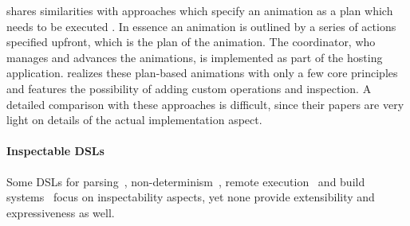 \dsl{} shares similarities with approaches which specify an animation as a plan
which needs to be executed
\cite{DBLP:conf/chi/KurlanderL95,DBLP:conf/eics/MirlacherPB12}. In essence an
animation is outlined by a series of actions specified upfront, which is the
plan of the animation. The coordinator, who manages and advances the
animations, is implemented as part of the hosting application. \dsl{} realizes
these plan-based animations with only a few core principles and features the
possibility of adding custom operations and inspection. A detailed comparison
with these approaches is difficult, since their papers are very light on
details of the actual implementation aspect.

\paragraph{Inspectable DSLs}

Some DSLs for
parsing~\cite{DBLP:journals/scp/Hughes00,DBLP:journals/corr/CapriottiK14,DBLP:conf/icfp/Lindley14},
non-determinism~\cite{DBLP:journals/corr/abs-1905-06544}, remote
execution~\cite{DBLP:conf/haskell/Gibbons16,DBLP:conf/haskell/GillSDEFGRSS15}
and build systems~\cite{DBLP:journals/pacmpl/MokhovMJ18} focus on inspectability aspects, yet
none provide extensibility and expressiveness as well.

